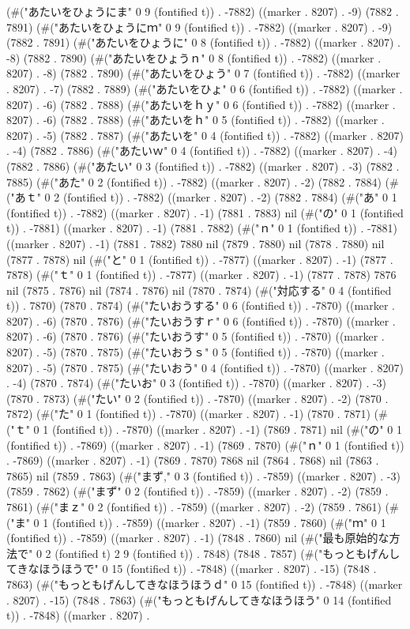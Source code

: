 (#("あたいをひょうにま" 0 9 (fontified t)) . -7882) ((marker . 8207) . -9) (7882 . 7891) (#("あたいをひょうにｍ" 0 9 (fontified t)) . -7882) ((marker . 8207) . -9) (7882 . 7891) (#("あたいをひょうに" 0 8 (fontified t)) . -7882) ((marker . 8207) . -8) (7882 . 7890) (#("あたいをひょうｎ" 0 8 (fontified t)) . -7882) ((marker . 8207) . -8) (7882 . 7890) (#("あたいをひょう" 0 7 (fontified t)) . -7882) ((marker . 8207) . -7) (7882 . 7889) (#("あたいをひょ" 0 6 (fontified t)) . -7882) ((marker . 8207) . -6) (7882 . 7888) (#("あたいをｈｙ" 0 6 (fontified t)) . -7882) ((marker . 8207) . -6) (7882 . 7888) (#("あたいをｈ" 0 5 (fontified t)) . -7882) ((marker . 8207) . -5) (7882 . 7887) (#("あたいを" 0 4 (fontified t)) . -7882) ((marker . 8207) . -4) (7882 . 7886) (#("あたいｗ" 0 4 (fontified t)) . -7882) ((marker . 8207) . -4) (7882 . 7886) (#("あたい" 0 3 (fontified t)) . -7882) ((marker . 8207) . -3) (7882 . 7885) (#("あた" 0 2 (fontified t)) . -7882) ((marker . 8207) . -2) (7882 . 7884) (#("あｔ" 0 2 (fontified t)) . -7882) ((marker . 8207) . -2) (7882 . 7884) (#("あ" 0 1 (fontified t)) . -7882) ((marker . 8207) . -1) (7881 . 7883) nil (#("の" 0 1 (fontified t)) . -7881) ((marker . 8207) . -1) (7881 . 7882) (#("ｎ" 0 1 (fontified t)) . -7881) ((marker . 8207) . -1) (7881 . 7882) 7880 nil (7879 . 7880) nil (7878 . 7880) nil (7877 . 7878) nil (#("と" 0 1 (fontified t)) . -7877) ((marker . 8207) . -1) (7877 . 7878) (#("ｔ" 0 1 (fontified t)) . -7877) ((marker . 8207) . -1) (7877 . 7878) 7876 nil (7875 . 7876) nil (7874 . 7876) nil (7870 . 7874) (#("対応する" 0 4 (fontified t)) . 7870) (7870 . 7874) (#("たいおうする" 0 6 (fontified t)) . -7870) ((marker . 8207) . -6) (7870 . 7876) (#("たいおうすｒ" 0 6 (fontified t)) . -7870) ((marker . 8207) . -6) (7870 . 7876) (#("たいおうす" 0 5 (fontified t)) . -7870) ((marker . 8207) . -5) (7870 . 7875) (#("たいおうｓ" 0 5 (fontified t)) . -7870) ((marker . 8207) . -5) (7870 . 7875) (#("たいおう" 0 4 (fontified t)) . -7870) ((marker . 8207) . -4) (7870 . 7874) (#("たいお" 0 3 (fontified t)) . -7870) ((marker . 8207) . -3) (7870 . 7873) (#("たい" 0 2 (fontified t)) . -7870) ((marker . 8207) . -2) (7870 . 7872) (#("た" 0 1 (fontified t)) . -7870) ((marker . 8207) . -1) (7870 . 7871) (#("ｔ" 0 1 (fontified t)) . -7870) ((marker . 8207) . -1) (7869 . 7871) nil (#("の" 0 1 (fontified t)) . -7869) ((marker . 8207) . -1) (7869 . 7870) (#("ｎ" 0 1 (fontified t)) . -7869) ((marker . 8207) . -1) (7869 . 7870) 7868 nil (7864 . 7868) nil (7863 . 7865) nil (7859 . 7863) (#("まず," 0 3 (fontified t)) . -7859) ((marker . 8207) . -3) (7859 . 7862) (#("まず" 0 2 (fontified t)) . -7859) ((marker . 8207) . -2) (7859 . 7861) (#("まｚ" 0 2 (fontified t)) . -7859) ((marker . 8207) . -2) (7859 . 7861) (#("ま" 0 1 (fontified t)) . -7859) ((marker . 8207) . -1) (7859 . 7860) (#("ｍ" 0 1 (fontified t)) . -7859) ((marker . 8207) . -1) (7848 . 7860) nil (#("最も原始的な方法で" 0 2 (fontified t) 2 9 (fontified t)) . 7848) (7848 . 7857) (#("もっともげんしてきなほうほうで" 0 15 (fontified t)) . -7848) ((marker . 8207) . -15) (7848 . 7863) (#("もっともげんしてきなほうほうｄ" 0 15 (fontified t)) . -7848) ((marker . 8207) . -15) (7848 . 7863) (#("もっともげんしてきなほうほう" 0 14 (fontified t)) . -7848) ((marker . 8207) . 